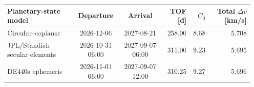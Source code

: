 \begin{tabular}{lccrrr}
\toprule
Planetary-state model & Departure & Arrival & TOF [d] & $C_3$ & Total $\Delta v$ [km/s] \\
\midrule
Circular--coplanar & 2026-12-06 & 2027-08-21 & 258.00 & 8.68 & 5.708 \\
JPL/Standish secular elements & 2026-10-31 06:00 & 2027-09-07 06:00 & 311.00 & 9.23 & 5.695 \\
DE440s ephemeris & 2026-11-01 06:00 & 2027-09-07 12:00 & 310.25 & 9.27 & 5.696 \\
\bottomrule
\end{tabular}